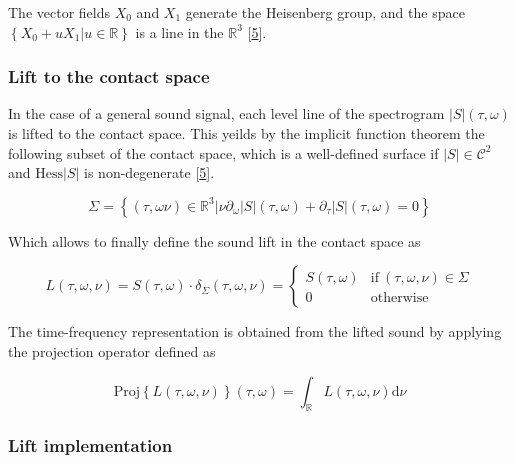 \documentclass[american,]{article}
\theoremstyle{definition}
\theoremstyle{definition}
\theoremstyle{definition}
\theoremstyle{remark}
\begin{document}
The vector fields \(X_0\) and \(X_1\) generate the Heisenberg group,
and the space \(\left\{X_0+uX_1\vert u\in\mathbb{R}\right\}\) is a line in the \(\mathbb{R}^3\) {[}\protect\hyperlink{ref-boscain2021}{5}{]}.

\hypertarget{lift-to-the-contact-space}{%
\subsubsection{Lift to the contact space}\label{lift-to-the-contact-space}}

In the case of a general sound signal, each level line of the spectrogram
\(\left\lvert S\right\rvert(\tau,\omega)\) is lifted to the contact space.
This yeilds by the implicit function theorem the following subset
of the contact space, which is a well-defined surface
if \(\left\lvert S\right\rvert\in\mathcal{C}^2\) and \(\mathrm{Hess}\left\lvert S\right\rvert\) is non-degenerate {[}\protect\hyperlink{ref-boscain2021}{5}{]}.

\begin{equation}
\Sigma = \left\{(\tau,\omega\nu)\in\mathbb{R}^3 \vert\nu\partial_\omega\left\lvert S\right\rvert(\tau,\omega) + \partial_\tau\left\lvert S\right\rvert(\tau,\omega) = 0\right\}
\end{equation}

Which allows to finally define the sound lift in the contact space as

\begin{equation}
L(\tau,\omega,\nu) = S(\tau,\omega)\cdot\delta_\Sigma (\tau,\omega,\nu) =
\begin{cases}
S(\tau,\omega) & \text{if}~(\tau,\omega,\nu)\in\Sigma\\
0          & \text{otherwise}
\end{cases}
\end{equation}

The time-frequency representation is obtained from the lifted sound
by applying the projection operator defined as

\begin{equation}
\mathrm{Proj}\left\{L(\tau,\omega,\nu)\right\}(\tau,\omega) = \int_\mathbb{R}L(\tau,\omega,\nu)\mathrm{d}\nu
\end{equation}

\hypertarget{lift-implementation}{%
\subsubsection{Lift implementation}\label{lift-implementation}}
\end{document}
